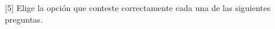 [5] Elige la opción que conteste correctamente cada una de las siguientes preguntas.

\begin{parts}
    
    
    
    
\end{parts}
